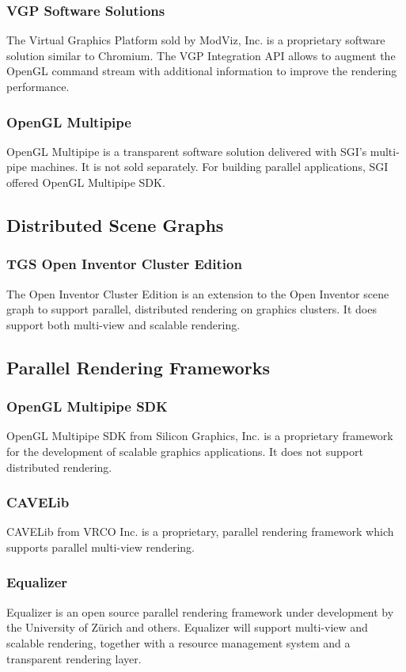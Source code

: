\documentclass[10pt,a4paper]{scrartcl}
\begin{document}
\subsubsection{VGP Software Solutions}
The Virtual Graphics Platform sold by ModViz, Inc. is a proprietary
software solution similar to Chromium. The VGP Integration API allows to
augment the OpenGL command stream with additional information to improve
the rendering performance.

\subsubsection{OpenGL Multipipe}
OpenGL Multipipe is a transparent software solution delivered with SGI's
multi-pipe machines. It is not sold separately. For building parallel
applications, SGI offered OpenGL Multipipe SDK.

\subsection{Distributed Scene Graphs}
\subsubsection{TGS Open Inventor Cluster Edition}
The Open Inventor Cluster Edition is an extension to the Open Inventor
scene graph to support parallel, distributed rendering on graphics
clusters. It does support both multi-view and scalable rendering.

\subsection{Parallel Rendering Frameworks}
\subsubsection{OpenGL Multipipe SDK}
OpenGL Multipipe SDK from Silicon Graphics, Inc. is a proprietary
framework for the development of scalable graphics applications. It does
not support distributed rendering.

\subsubsection{CAVELib}
CAVELib from VRCO Inc. is a proprietary, parallel rendering framework
which supports parallel multi-view rendering.

\subsubsection{Equalizer}
Equalizer is an open source parallel rendering framework under development
by the University of Z\"urich and others. Equalizer will
support multi-view and scalable rendering, together with a resource
management system and a transparent rendering layer.
\end{document}
